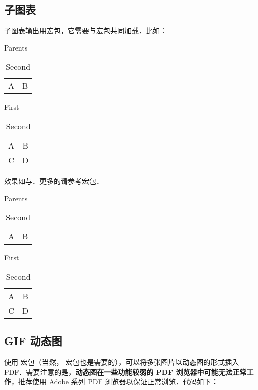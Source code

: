 \subsection{子图表}
子图表输出用宏包，它需要与宏包共同加载．比如：
\begin{latex}
\usepackage{caption,subcaption}
  \captionsetup[sub]{labelformat=simple}
  \renewcommand{\thesubtable}{(\alph{subtable})}
\begin{table}
\caption{Parents}
\begin{subtable}[b]{0.5\linewidth}
  \centering
  \begin{tabular}{|c|c|}
  A & B \\ \end{tabular}
  \caption{First}\label{...}
\end{subtable}  
\begin{subtable}[b]{0.5\linewidth}
  \centering
  \begin{tabular}{|c|c|}
  A & B \\ C & D \end{tabular}
  \caption{Second}
\end{subtable}  
\end{table}
\end{latex}

效果如与．更多的请参考宏包．
\begin{table}[!htb]
\caption{Parents}
\begin{subtable}[b]{0.5\linewidth}
  \centering
  \begin{tabular}{|c|c|}
  A & B \\ \end{tabular}
  \caption{First}\label{subtab:subcaption1}
\end{subtable}  
\begin{subtable}[b]{0.5\linewidth}
  \centering
  \begin{tabular}{|c|c|}
  A & B \\ C & D \end{tabular}
  \caption{Second}\label{subtab:subcaption2}
\end{subtable}  
\end{table}

\subsection{GIF 动态图}
使用  宏包（当然， 宏包也是需要的），可以将多张图片以动态图的形式插入 PDF．需要注意的是，\textbf{动态图在一些功能较弱的 PDF 浏览器中可能无法正常工作}，推荐使用 Adobe 系列 PDF 浏览器以保证正常浏览．代码如下：
\begin{latex}
\begin{figure}[!hbt]
  \centering
\end{figure}
\end{latex}

